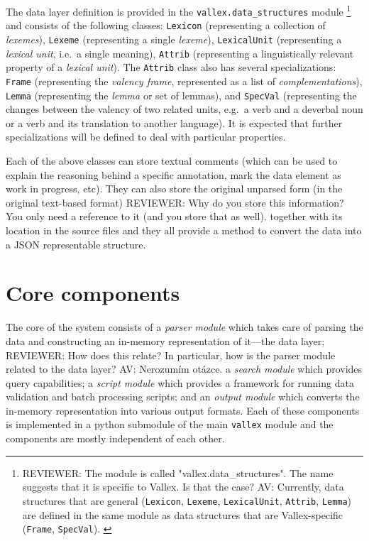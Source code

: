\documentclass[10pt, a4paper]{article}
\newcommand{\py}[1]{{\tt #1}}
\newcommand{\av}[1]{{\color{ansa} AV: #1}}
\newcommand{\rrr}[1]{{\color{red} REVIEWER: #1}}
\begin{document}
The data layer definition is provided in the \py{vallex.data\_structures} module%
\footnote{%
\rrr{The module is called "vallex.data\_structures". The name suggests that it is specific to Vallex. Is that the case?
} 
\av{Currently, data structures that are general
(\py{Lexicon}, \py{Lexeme}, \py{LexicalUnit}, \py{Attrib}, \py{Lemma})
are defined in the same module as data structures that are Vallex-specific 
(\py{Frame}, \py{SpecVal}).
}
}
and consists of the
following classes:
\py{Lexicon} (representing a collection of \emph{lexemes}), \py{Lexeme} (representing
a single \emph{lexeme}), \py{LexicalUnit} (representing a \emph{lexical unit}, i.e.\ a single meaning), \py{Attrib} (representing a linguistically relevant property of a \emph{lexical unit}). The \py{Attrib} class also has several specializations:
\py{Frame} (representing the \emph{valency frame}, represented as a list of \emph{complementations}),
\py{Lemma} (representing the \emph{lemma} or set of lemmas), and
\py{SpecVal} (representing the changes between the valency of two related units,
e.g.\ a verb and a deverbal noun or a verb and its translation to another language).
It is expected that further specializations
will be defined to deal with particular properties.

Each of the above classes can store textual comments (which can be used to explain
the reasoning behind a specific annotation, mark the data element as work in progress, etc). 
They can also
store the original unparsed form (in the original text-based format) 
\rrr{Why do you store this information? You only need a reference to it (and you store that as well).}
together with its location in the source files 
and they all provide a method to convert the data into a JSON representable structure.

\section{Core components}
The core of the system consists of a \emph{parser module} which takes care of parsing the data and
constructing an in-memory representation of it---the data layer; 
\rrr{How does this relate? In particular, how is the parser module related to the data layer?}
\av{Nerozumím otázce.}
a \emph{search module} which
provides query capabilities; a \emph{script module} which provides a framework for running data validation
and batch processing scripts; and an \emph{output module} which converts the in-memory representation into
various output formats. Each of these components is implemented in a python submodule of the main \py{vallex}
module and the components are mostly independent of each other.
\end{document}
